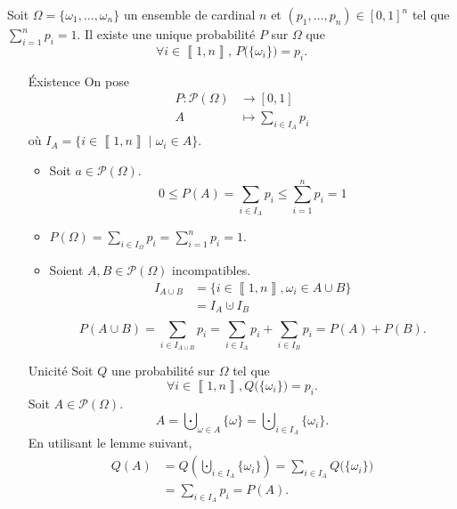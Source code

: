 \begin{prop}
	Soit $\Omega = \{\omega_1,\ldots,\omega_n\}$ un ensemble de cardinal $n$ et $(p_1, \ldots, p_n) \in [0,1]^n$ tel que $\sum_{i=1}^n p_i = 1$. Il existe une unique probabilité $P$ sur $\Omega$ que \[
		\forall i \in \left\llbracket 1,n \right\rrbracket,\, P\big(\{\omega_i\} \big) = p_i.
	\]
\end{prop}

\begin{prv}
	\begin{itemize}
		\item[Éxistence] On pose \begin{align*}
				P: \mathcal{P}(\Omega) &\longrightarrow [0,1] \\
				A &\longmapsto \sum_{i \in I_A} p_i
			\end{align*} où $I_A = \big\{i \in \left\llbracket 1,n \right\rrbracket  \mid \omega_i \in A\big\}$.
			\begin{itemize}
				\item Soit $a \in \mathcal{P}(\Omega)$. \[
						0 \le P(A) = \sum_{i \in I_A} p_i \le \sum_{i = 1}^n p_i = 1
					\] 
				\item $P(\Omega) = \sum_{i \in I_\Omega} p_i = \sum_{i=1}^n p_i = 1$.
				\item Soient $A, B \in \mathcal{P}(\Omega)$ incompatibles.
					\begin{align*}
						I_{A\cup B} &= \{ i \in \left\llbracket 1,n \right\rrbracket, \omega_i \in A \cup B\}\\
						&= I_A \cupdot I_B \\
					\end{align*} \[
						P(A \cup B) = \sum_{i \in I_{A\cup B}} p_i = \sum_{i \in I_A} p_i + \sum_{i \in I_B} p_i = P(A) + P(B).
					\]
			\end{itemize}
		\item[Unicité] Soit $Q$ une probabilité sur $\Omega$ tel que \[
				\forall i \in \left\llbracket 1,n \right\rrbracket, Q\big(\{\omega_i\}\big) = p_i.
			\] Soit $A \in \mathcal{P}(\Omega)$. \[
				A = \bigcupdot_{\omega \in A} \{\omega\} = \bigcupdot_{i \in I_A} \{\omega_i\}.
			\] En utilisant le lemme suivant,
			\begin{align*}
				Q(A) &= Q\left( \bigcupdot_{i \in I_A} \{\omega_i\} \right) = \sum_{i \in I_A} Q\big(\{\omega_i\}\big)\\
				&= \sum_{i \in I_A} p_i = P(A). \\
			\end{align*}
	\end{itemize}
\end{prv}

